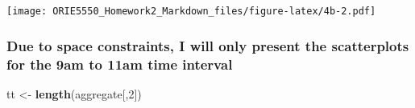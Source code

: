 \documentclass[
]{article}
\newenvironment{Shaded}{\begin{snugshade}}{\end{snugshade}}
\newcommand{\DecValTok}[1]{\textcolor[rgb]{0.00,0.00,0.81}{#1}}
\newcommand{\FunctionTok}[1]{\textcolor[rgb]{0.13,0.29,0.53}{\textbf{#1}}}
\newcommand{\NormalTok}[1]{#1}
\newcommand{\OtherTok}[1]{\textcolor[rgb]{0.56,0.35,0.01}{#1}}
\begin{document}
\texttt{[image: ORIE5550\_Homework2\_Markdown\_files/figure-latex/4b-2.pdf]}

\hypertarget{due-to-space-constraints-i-will-only-present-the-scatterplots-for-the-9am-to-11am-time-interval}{%
\subsubsection{Due to space constraints, I will only present the
scatterplots for the 9am to 11am time
interval}\label{due-to-space-constraints-i-will-only-present-the-scatterplots-for-the-9am-to-11am-time-interval}}

\begin{Shaded}
\begin{Highlighting}[]
\NormalTok{tt }\OtherTok{\textless{}{-}} \FunctionTok{length}\NormalTok{(aggregate[,}\DecValTok{2}\NormalTok{])}


\end{Highlighting}
\end{Shaded}
\end{document}
